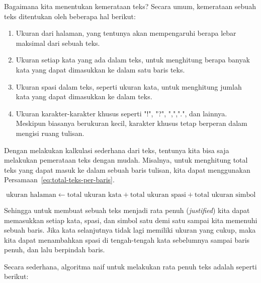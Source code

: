 Bagaimana kita menentukan kemerataan teks? Secara umum, kemerataan sebuah teks ditentukan oleh beberapa hal berikut:

\begin{enumerate}
    \item Ukuran dari halaman, yang tentunya akan mempengaruhi berapa lebar maksimal dari sebuah teks.
    \item Ukuran setiap kata yang ada dalam teks, untuk menghitung berapa banyak kata yang dapat dimasukkan ke dalam satu baris teks.
    \item Ukuran spasi dalam teks, seperti ukuran kata, untuk menghitung jumlah kata yang dapat dimasukkan ke dalam teks.
    \item Ukuran karakter-karakter khusus seperti "!", "?", ",",".", dan lainnya. Meskipun biasanya berukuran kecil, karakter khusus tetap berperan dalam mengisi ruang tulisan.
\end{enumerate}

Dengan melakukan kalkulasi sederhana dari teks, tentunya kita bisa saja melakukan pemerataan teks dengan mudah. Misalnya, untuk menghitung total teks yang dapat masuk ke dalam sebuah baris tulisan, kita dapat menggunakan Persamaan~\ref{eq:total-teks-per-baris}.

\begin{equation}\label{eq:total-teks-per-baris}
    \text{ukuran halaman} \gets \text{total ukuran kata} + \text{total ukuran spasi} + \text{total ukuran simbol}
\end{equation}

Sehingga untuk membuat sebuah teks menjadi rata penuh (\textit{justified}) kita dapat memasukkan setiap kata, spasi, dan simbol satu demi satu sampai kita memenuhi sebuah baris. Jika kata selanjutnya tidak lagi memiliki ukuran yang cukup, maka kita dapat menambahkan spasi di tengah-tengah kata sebelumnya sampai baris penuh, dan lalu berpindah baris.

Secara sederhana, algoritma naif untuk melakukan rata penuh teks adalah seperti berikut:

